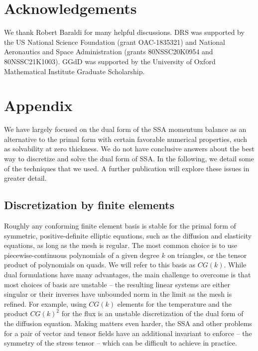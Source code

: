 \documentclass[review,oneside]{igs}
\begin{document}
\section{Acknowledgements}

We thank Robert Baraldi for many helpful discussions.
DRS was supported by the US National Science Foundation (grant OAC-1835321) and National Aeronautics and Space Administration (grants 80NSSC20K0954 and 80NSSC21K1003).
GGdD was supported by the University of Oxford Mathematical Institute Graduate Scholarship.




\pagebreak



\appendix\section{Appendix}

We have largely focused on the dual form of the SSA momentum balance as an alternative to the primal form with certain favorable numerical properties, such as solvability at zero thickness.
We do not have conclusive answers about the best way to discretize and solve the dual form of SSA.
In the following, we detail some of the techniques that we used.
A further publication will explore these issues in greater detail.

\subsection{Discretization by finite elements}
\label{app:discretization}

Roughly any conforming finite element basis is stable for the primal form of symmetric, positive-definite elliptic equations, such as the diffusion and elasticity equations, as long as the mesh is regular.
The most common choice is to use piecewise-continuous polynomials of a given degree $k$ on triangles, or the tensor product of polynomials on quads.
We will refer to this basis as $CG(k)$.
While dual formulations have many advantages, the main challenge to overcome is that most choices of basis are unstable -- the resulting linear systems are either singular or their inverses have unbounded norm in the limit as the mesh is refined.
For example, using $CG(k)$ elements for the temperature and the product $CG(k)^2$ for the flux is an unstable discretization of the dual form of the diffusion equation.
Making matters even harder, the SSA and other problems for a pair of vector and tensor fields have an additional invariant to enforce -- the symmetry of the stress tensor -- which can be difficult to achieve in practice.
\end{document}
